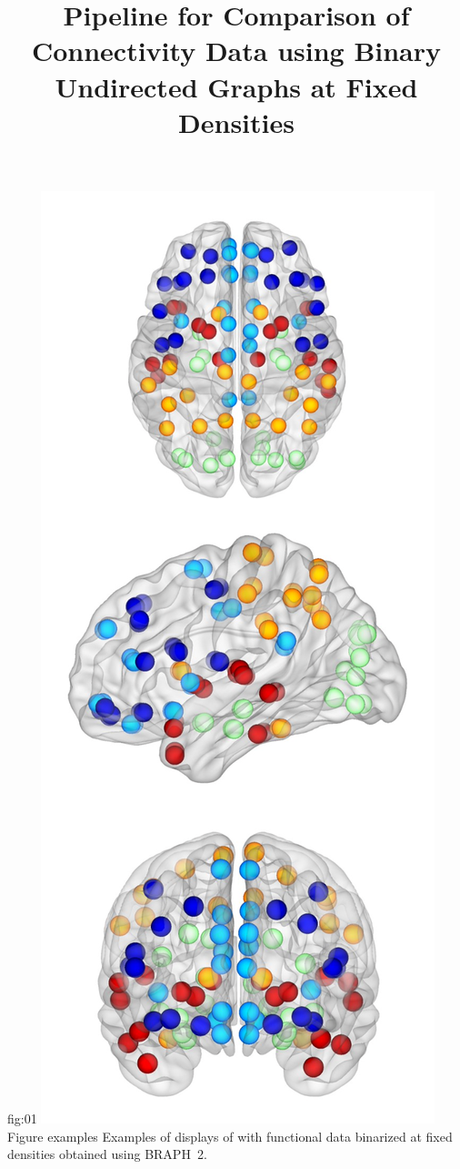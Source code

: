 \documentclass[justified]{tufte-handout}
\title[Comparison of Functional Data using BUD]{Pipeline for Comparison of Connectivity Data using Binary Undirected Graphs at Fixed Densities}
\begin{document}
\maketitle

	{fig:01}
	{\includegraphics{fig01.png}}
	{Figure examples}
	{
	Examples of displays of  with functional data binarized at fixed densities obtained using BRAPH~2.
	}
\end{document}
